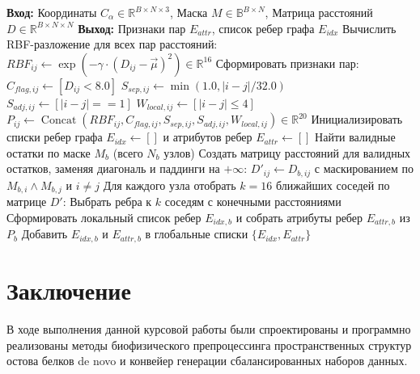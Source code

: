 \documentclass[12pt, a4paper]{article}
\begin{document}
\begin{algorithm}[h]
\caption{Построение парных признаков и kNN-графа}
\label{alg:pair_features}
\begin{algorithmic}[1]
\Statex \textbf{Вход:} Координаты $C_\alpha \in \mathbb{R}^{B \times N \times 3}$, Маска $M \in \mathbb{B}^{B \times N}$, Матрица расстояний $D \in \mathbb{R}^{B \times N \times N}$
\Statex \textbf{Выход:} Признаки пар $E_{attr}$, список ребер графа $E_{idx}$
\State Вычислить RBF-разложение для всех пар расстояний:
\State \quad $RBF_{ij} \gets \exp\left(-\gamma \cdot (D_{ij} - \vec{\mu})^2\right) \in \mathbb{R}^{16}$
\State Сформировать признаки пар:
\State \quad $C_{flag, ij} \gets [D_{ij} < 8.0]$ 
\State \quad $S_{sep, ij} \gets \min(1.0, |i-j| / 32.0)$ 
\State \quad $S_{adj, ij} \gets [|i-j| == 1]$ 
\State \quad $W_{local, ij} \gets [|i-j| \le 4]$ 
\State \quad $P_{ij} \gets \operatorname{Concat}(RBF_{ij}, C_{flag, ij}, S_{sep, ij}, S_{adj, ij}, W_{local, ij}) \in \mathbb{R}^{20}$
\State Инициализировать списки ребер графа $E_{idx} \gets []$ и атрибутов ребер $E_{attr} \gets []$
    \State Найти валидные остатки по маске $M_b$ (всего $N_b$ узлов)
    \State Создать матрицу расстояний для валидных остатков, заменяя диагональ и паддинги на $+\infty$:
    \State \quad $D'_{ij} \gets D_{b, ij}$ с маскированием по $M_{b, i} \land M_{b, j}$ и $i \neq j$
    \State Для каждого узла отобрать $k=16$ ближайших соседей по матрице $D'$:
    \State \quad Выбрать ребра к $k$ соседям с конечными расстояниями
    \State Сформировать локальный список ребер $E_{idx, b}$ и собрать атрибуты ребер $E_{attr, b}$ из $P_b$
    \State Добавить $E_{idx, b}$ и $E_{attr, b}$ в глобальные списки
\EndFor
\State \Return $\{E_{idx}, E_{attr}\}$
\end{algorithmic}
\end{algorithm}

\newpage

\section{Заключение}
В ходе выполнения данной курсовой работы были спроектированы и программно реализованы методы биофизического препроцессинга пространственных структур остова белков de novo и конвейер генерации сбалансированных наборов данных.
\end{document}
